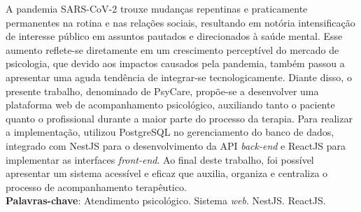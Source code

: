 \begin{resumo}[RESUMO]
\begin{SingleSpacing}

A pandemia SARS-CoV-2 trouxe mudanças repentinas e praticamente permanentes na rotina e nas relações sociais, resultando em notória intensificação de interesse público em assuntos pautados e direcionados à saúde mental. Esse aumento reflete-se diretamente em um crescimento perceptível do mercado de psicologia, que devido aos impactos causados pela pandemia, também passou a apresentar uma aguda tendência de integrar-se tecnologicamente. Diante disso, o presente trabalho, denominado de PsyCare, propõe-se a desenvolver uma plataforma web de acompanhamento psicológico, auxiliando tanto o paciente quanto o profissional durante a maior parte do processo da terapia. Para realizar a implementação, utilizou PostgreSQL no gerenciamento do banco de dados, integrado com NestJS para o desenvolvimento da API \textit{back-end} e ReactJS para implementar as interfaces \textit{front-end}. Ao final deste trabalho, foi possível apresentar um sistema acessível e eficaz que auxilia, organiza e centraliza o processo de acompanhamento terapêutico. \\

\textbf{Palavras-chave}: Atendimento psicológico. Sistema \textit{web}. NestJS. ReactJS.

\end{SingleSpacing}
\end{resumo}

